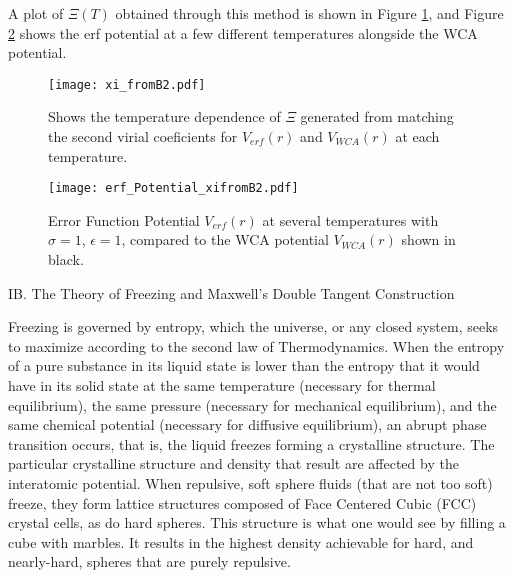 \documentclass[12pt]{article}
\begin{document}
A plot of $\Xi(T)$ obtained through this method is shown in Figure \ref{fig:xi_fromB2vsT}, and Figure \ref{fig:erf_Potential_xifromB2} shows the erf potential at a few different temperatures alongside the WCA potential. 

\begin{figure}[h!]
    \centering
    \texttt{[image: xi\_fromB2.pdf]}
    \caption{Shows the temperature dependence of $\Xi$ generated from matching the second virial coeficients for $V_{erf}(r)$ and $V_{WCA}(r)$ at each temperature.}
    \label{fig:xi_fromB2vsT}
  \end{figure}


\begin{figure}[h!]
    \centering
    \texttt{[image: erf\_Potential\_xifromB2.pdf]}
    \caption{Error Function Potential $V_{erf}(r)$ at several temperatures with $\sigma=1$, $\epsilon=1$, compared to the WCA potential $V_{WCA}(r)$ shown in black.}
    \label{fig:erf_Potential_xifromB2}
  \end{figure}



\[\]
\noindent IB. The Theory of Freezing and Maxwell's Double Tangent Construction

Freezing is governed by entropy, which the universe, or any closed system, seeks to maximize according to the second law of Thermodynamics. When the entropy of a pure substance in its liquid state is lower than the entropy that it would have in its solid state at the same temperature (necessary for thermal equilibrium), the same pressure (necessary for mechanical equilibrium), and the same chemical potential (necessary for diffusive equilibrium), an abrupt phase transition occurs, that is, the liquid freezes forming a crystalline structure. The particular crystalline structure and density that result are affected by the interatomic potential. When repulsive, soft sphere fluids (that are not too soft) freeze, they form lattice structures composed of Face Centered Cubic (FCC) crystal cells, as do hard spheres. %
This structure is what one would see by filling a cube with marbles. It results in the highest density achievable for hard, and nearly-hard, spheres that are purely repulsive. 
\end{document}
